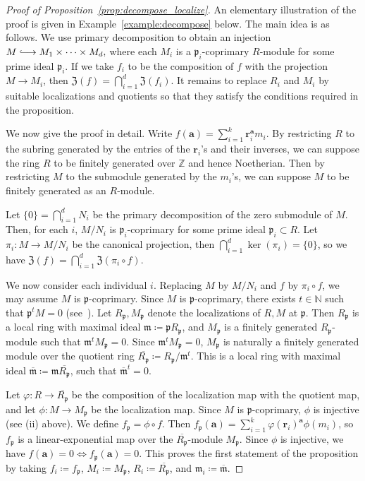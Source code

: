 \documentclass[letterpaper, 11pt, thm-restate]{article}
\numberwithin{equation}{section}
\newcommand{\Z}{\mathbb{Z}}
\newcommand{\N}{\mathbb{N}}
\newcommand{\mZ}{\mathfrak{Z}}
\newcommand{\ba}{\boldsymbol{a}}
\newcommand{\br}{\boldsymbol{r}}
\newcommand{\frp}{\mathfrak{p}}
\newcommand{\frm}{\mathfrak{m}}
\newcommand{\hooklongrightarrow}{\lhook\joinrel\longrightarrow}
\theoremstyle{definition}
\theoremstyle{definition}
\theoremstyle{definition}
\begin{document}
\begin{proof}[Proof of Proposition~\ref{prop:decompose_localize}]
    An elementary illustration of the proof is given in Example~\ref{example:decompose} below.
    The main idea is as follows.
    We use primary decomposition to obtain an injection
    $
    M \hooklongrightarrow M_1 \times \cdots \times M_d,
    $
    where each $M_i$ is a $\frp_i$-coprimary $R$-module for some prime ideal $\frp_i$.
    If we take $f_i$ to be the composition of $f$ with the projection $M \rightarrow M_i$, then $\mZ(f) = \bigcap_{i = 1}^d \mZ(f_i)$.
    It remains to replace $R_i$ and $M_i$ by suitable localizations and quotients so that they satisfy the conditions required in the proposition.
    
    We now give the proof in detail. 
    Write $f(\ba) = \sum_{i=1}^k \br_i^{\ba} m_i$.
    By restricting $R$ to the subring generated by the entries of the $\br_i$'s and their inverses, we can suppose the ring $R$ to be finitely generated over $\Z$ and hence Noetherian.
    Then by restricting $M$ to the submodule generated by the $m_i$'s, we can suppose $M$ to be finitely generated as an $R$-module.
    
    Let $\{0\} = \bigcap_{i = 1}^d N_i$ be the primary decomposition of the zero submodule of $M$.
    Then, for each $i$, $M/N_i$ is $\frp_i$-coprimary for some prime ideal $\frp_i \subset R$.
    Let $\pi_i \colon M\rightarrow M/N_i$ be the canonical projection, then $\bigcap_{i = 1}^d \ker(\pi_i) = \{0\}$, so we have $\mZ(f)=\bigcap_{i = 1}^d \mZ(\pi_i\circ f)$.
    
    We now consider each individual $i$.
    Replacing $M$ by $M/N_i$ and $f$ by $\pi_i\circ f$, we may assume $M$ is $\frp$-coprimary. 
    Since $M$ is $\frp$-coprimary, there exists $t \in \N$ such that $\frp^tM=0$ (see~\cite[Proposition~3.9]{eisenbud2013commutative}). 
    Let $R_{\frp},M_\frp$ denote the localizations of $R, M$ at $\frp$.
    Then $R_{\frp}$ is a local ring with maximal ideal $\frm \coloneqq \frp R_{\frp}$, and $M_{\frp}$ is a finitely generated $R_{\frp}$-module such that $\frm^t M_{\frp} = 0$.
    Since $\frm^t M_{\frp} = 0$, $M_{\frp}$ is naturally a finitely generated module over the quotient ring $\overline{R_{\frp}} \coloneqq R_{\frp}/\frm^t$.
    This is a local ring with maximal ideal $\overline{\frm} \coloneqq \frm \overline{R_{\frp}}$, such that $\overline{\frm}^t = 0$.
    
    Let $\varphi \colon R \rightarrow \overline{R_{\frp}}$ be the composition of the localization map with the quotient map, and let $\phi \colon M \rightarrow M_{\frp}$ be the localization map.
    Since $M$ is $\frp$-coprimary, $\phi$ is injective (see (ii) above).
    We define $f_{\frp}=\phi\circ f$. 
    Then $f_{\frp}(\ba) = \sum_{i=1}^k \varphi(\br_i)^{\ba} \phi(m_i)$, so $f_{\frp}$ is a linear-exponential map over the $\overline{R_{\frp}}$-module $M_{\frp}$. 
    Since $\phi$ is injective, we have $f(\ba) = 0 \iff f_{\frp}(\ba) = 0$.
    This proves the first statement of the proposition by taking $f_i \coloneqq f_{\frp}$, $M_i \coloneqq M_{\frp}$, $R_i \coloneqq \overline{R_{\frp}}$, and $\frm_i \coloneqq \overline{\frm}$.


\end{proof}
\end{document}
